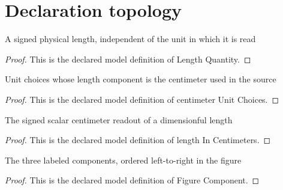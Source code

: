 \section{Declaration topology}
\begin{definition}
  \label{def:physics:phyx-mini-0032:phyxminiproblems-problemphyxmini0032-lengthquantity}
  A signed physical length, independent of the unit in which it is read
\end{definition}
\begin{proof}
  This is the declared model definition of Length Quantity.
\end{proof}
\begin{definition}
  \label{def:physics:phyx-mini-0032:phyxminiproblems-problemphyxmini0032-centimeterunitchoices}
  Unit choices whose length component is the centimeter used in the source
\end{definition}
\begin{proof}
  This is the declared model definition of centimeter Unit Choices.
\end{proof}
\begin{definition}
  \label{def:physics:phyx-mini-0032:phyxminiproblems-problemphyxmini0032-lengthincentimeters}
  The signed scalar centimeter readout of a dimensionful length
\end{definition}
\begin{proof}
  This is the declared model definition of length In Centimeters.
\end{proof}
\begin{definition}
  \label{def:physics:phyx-mini-0032:phyxminiproblems-problemphyxmini0032-figurecomponent}
  The three labeled components, ordered left-to-right in the figure
\end{definition}
\begin{proof}
  This is the declared model definition of Figure Component.
\end{proof}
